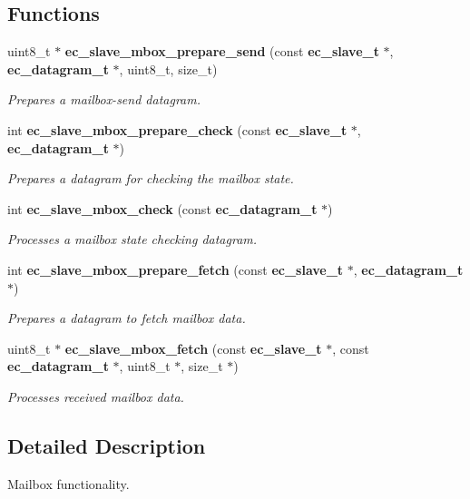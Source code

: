 \subsection*{Functions}
\begin{DoxyCompactItemize}
\item 
uint8\-\_\-t $\ast$ {\bf ec\-\_\-slave\-\_\-mbox\-\_\-prepare\-\_\-send} (const {\bf ec\-\_\-slave\-\_\-t} $\ast$, {\bf ec\-\_\-datagram\-\_\-t} $\ast$, uint8\-\_\-t, size\-\_\-t)
\begin{DoxyCompactList}\small\item\em Prepares a mailbox-\/send datagram. \end{DoxyCompactList}\item 
int {\bf ec\-\_\-slave\-\_\-mbox\-\_\-prepare\-\_\-check} (const {\bf ec\-\_\-slave\-\_\-t} $\ast$, {\bf ec\-\_\-datagram\-\_\-t} $\ast$)
\begin{DoxyCompactList}\small\item\em Prepares a datagram for checking the mailbox state. \end{DoxyCompactList}\item 
int {\bf ec\-\_\-slave\-\_\-mbox\-\_\-check} (const {\bf ec\-\_\-datagram\-\_\-t} $\ast$)
\begin{DoxyCompactList}\small\item\em Processes a mailbox state checking datagram. \end{DoxyCompactList}\item 
int {\bf ec\-\_\-slave\-\_\-mbox\-\_\-prepare\-\_\-fetch} (const {\bf ec\-\_\-slave\-\_\-t} $\ast$, {\bf ec\-\_\-datagram\-\_\-t} $\ast$)
\begin{DoxyCompactList}\small\item\em Prepares a datagram to fetch mailbox data. \end{DoxyCompactList}\item 
uint8\-\_\-t $\ast$ {\bf ec\-\_\-slave\-\_\-mbox\-\_\-fetch} (const {\bf ec\-\_\-slave\-\_\-t} $\ast$, const {\bf ec\-\_\-datagram\-\_\-t} $\ast$, uint8\-\_\-t $\ast$, size\-\_\-t $\ast$)
\begin{DoxyCompactList}\small\item\em Processes received mailbox data. \end{DoxyCompactList}\end{DoxyCompactItemize}


\subsection{Detailed Description}
Mailbox functionality. 


